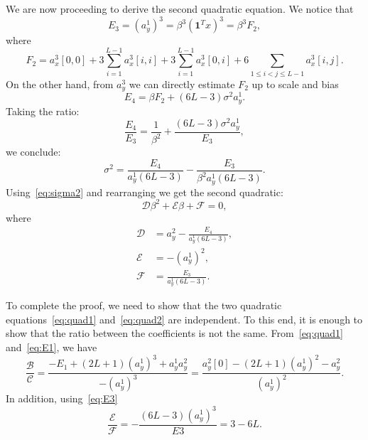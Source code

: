 \documentclass[english,11pt]{article}
\newcommand{\TODO}[1]{{\color{red}{[#1]}}}
\numberwithin{equation}{section}
\theoremstyle{plain}
\theoremstyle{definition}
\theoremstyle{remark}
\theoremstyle{plain}
\theoremstyle{remark}
\theoremstyle{plain}
\theoremstyle{plain}
\newcommand{\one}{\mathbf{1}}
\begin{document}
We are now proceeding to derive the second quadratic equation. We notice that 
\begin{equation} \label{eq:E3}
E_3  = (a_y^1)^3 = \beta^3 (\one ^Tx)^3   = \beta^3 F_2,
\end{equation}
where \TODO{to verify}
\begin{equation*}
F_2 =  a_x^3[0,0] + 3\sum_{i=1}^{L-1}a_x^3[i,i] + 3\sum_{i=1}^{L-1}a_x^3[0,i] + 6\sum_{1\leq i < j\leq L-1}a_x^3[i,j].
\end{equation*}
On the other hand, from $a_y^3$ we can directly estimate $F_2$ up to scale and bias
\begin{equation} \label{eq:E4}
E_4 = \beta F_2 + (6L-3)\sigma^2a_y^1.
\end{equation}
Taking the ratio:
\begin{equation*} 
\frac{E_4}{E_3} = \frac{1}{\beta^2} + \frac{(6L-3)\sigma^2a_y^1}{E_3}, 
\end{equation*}
we conclude:
\begin{equation*}
\sigma^2 = \frac{E_4}{a_y^1(6L-3)}  - \frac{E_3}{\beta^2a_y^1(6L-3)}.
\end{equation*}
Using~\eqref{eq:sigma2} and rearranging we get the second quadratic:
\begin{equation} \label{eq:quad2}
\mathcal{D}\beta^2 + \mathcal{E}\beta + \mathcal{F} = 0,
\end{equation}
where
\begin{align*}
\mathcal{D} &= a_y^2 - \frac{E_4}{a_y^1(6L-3)}, \\ 
\mathcal{E} &= -(a_y^1)^2, \\
\mathcal{F} &= \frac{E_3}{a_y^1(6L-3)}.
\end{align*}

To complete the proof, we need to show that the two quadratic equations~\eqref{eq:quad1} and~\eqref{eq:quad2} are independent. To this end, it is enough to show that the ratio between the coefficients is not the same. 
From~\eqref{eq:quad1} and~\eqref{eq:E1}, we have 
\begin{equation*}
\frac{\mathcal{B}}{\mathcal{C}} = \frac{-E_1 + (2L+1)(a_y^1)^3 + a_y^1a_y^2}{-(a_y^1)^3} = \frac{a_y^2[0] - (2L+1)(a_y^1)^2 - a_y^2}{(a_y^1)^2}.
\end{equation*}
In addition, using~\eqref{eq:E3}
\begin{equation*}
\frac{\mathcal{E}}{\mathcal{F}} = -\frac{(6L-3)(a_y^1)^3}{E3} = 3 - 6L . 
\end{equation*}
\end{document}
